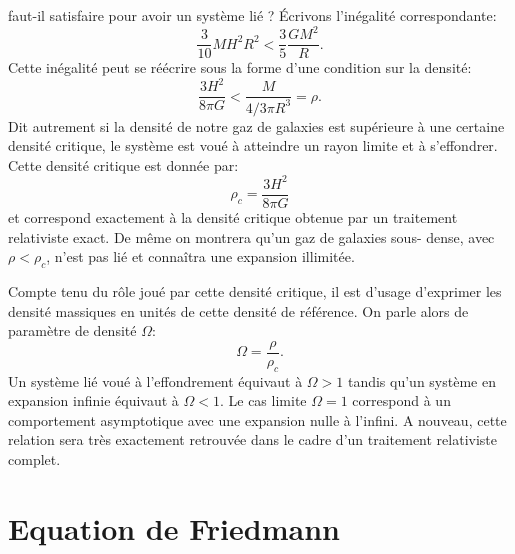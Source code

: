  faut-il satisfaire pour avoir un système lié ? Écrivons l'inégalité correspondante:
\begin{equation}
\frac{3}{10} M H^2 R^2 <\frac{3}{5}\frac{GM^2}{R}.
\end{equation}
Cette inégalité peut se réécrire sous la forme d'une condition sur la densité:
\begin{equation}
\frac{3H^2}{8\pi G}< \frac{M}{4/3\pi R^3}=\rho.
\end{equation}
Dit autrement si la densité de notre gaz de galaxies est supérieure à une certaine densité critique, le système est voué à atteindre un rayon limite et à s'effondrer. Cette densité critique  est donnée par:
\begin{equation}
\rho_c =\frac{3H^2}{8\pi G}
\end{equation}
et correspond exactement à la densité critique obtenue par un traitement relativiste exact. De même on montrera qu'un gaz de galaxies sous- dense, avec $\rho< \rho_c$, n'est pas lié et  connaîtra une expansion illimitée. 

Compte tenu du rôle joué par cette densité critique, il est d'usage d'exprimer les densité massiques en unités de cette densité de référence. On parle alors de paramètre de densité  $\Omega$:
\begin{equation}
\Omega=\frac{\rho}{\rho_c}.
\end{equation}
Un système lié voué à l'effondrement équivaut à $\Omega>1$ tandis qu'un système en expansion infinie équivaut à $\Omega<1$. Le cas limite $\Omega=1$ correspond à un comportement asymptotique avec une expansion nulle à l'infini. A nouveau, cette relation sera très exactement retrouvée dans le cadre d'un traitement relativiste complet.

\section{Equation de Friedmann}

